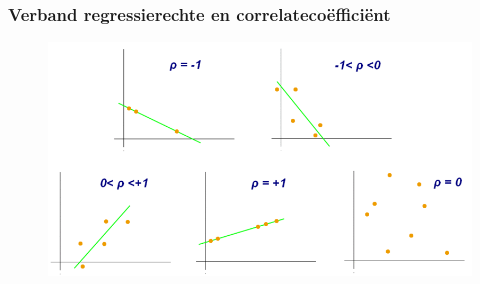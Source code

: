 \documentclass[aspectratio=169]{beamer}
\begin{document}
\begin{frame}
  \frametitle{Verband regressierechte en correlateco\"effici\"ent}

  \begin{figure}
    \centering
    \includegraphics[height=\textheight]{img/les3-regressie.png}
    \label{fig:les3-regressie}
  \end{figure}

\end{frame}

\end{document}
